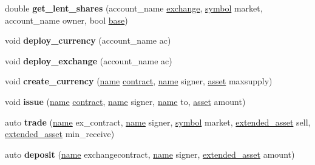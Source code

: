 \begin{DoxyCompactItemize}
\mbox{\label{classexchange__tester_aa583cf62252cc0e19d80e8287cd9a778}} 
double {\bfseries get\+\_\+lent\+\_\+shares} (account\+\_\+name \mbox{\hyperlink{classaacio_1_1exchange}{exchange}}, \mbox{\hyperlink{classaacio_1_1chain_1_1symbol}{symbol}} market, account\+\_\+name owner, bool \mbox{\hyperlink{structbase}{base}})
\item 
\mbox{\label{classexchange__tester_a01149395f13873c6f4264006b2756106}} 
void {\bfseries deploy\+\_\+currency} (account\+\_\+name ac)
\item 
\mbox{\label{classexchange__tester_ade5139d1cbaf91c2c8cbe19b256f460c}} 
void {\bfseries deploy\+\_\+exchange} (account\+\_\+name ac)
\item 
\mbox{\label{classexchange__tester_aa07ea33a6d74c6dbaf5fabd5353eaa78}} 
void {\bfseries create\+\_\+currency} (\mbox{\hyperlink{structaacio_1_1name}{name}} \mbox{\hyperlink{structaacio_1_1contract}{contract}}, \mbox{\hyperlink{structaacio_1_1name}{name}} signer, \mbox{\hyperlink{structaacio_1_1asset}{asset}} maxsupply)
\item 
\mbox{\label{classexchange__tester_a7f21ec8422d1bd3393534f856f1eddb8}} 
void {\bfseries issue} (\mbox{\hyperlink{structaacio_1_1name}{name}} \mbox{\hyperlink{structaacio_1_1contract}{contract}}, \mbox{\hyperlink{structaacio_1_1name}{name}} signer, \mbox{\hyperlink{structaacio_1_1name}{name}} to, \mbox{\hyperlink{structaacio_1_1asset}{asset}} amount)
\item 
\mbox{\label{classexchange__tester_ad0e2032e39b73cd0e6e00017b6245a45}} 
auto {\bfseries trade} (\mbox{\hyperlink{structaacio_1_1name}{name}} ex\+\_\+contract, \mbox{\hyperlink{structaacio_1_1name}{name}} signer, \mbox{\hyperlink{classaacio_1_1chain_1_1symbol}{symbol}} market, \mbox{\hyperlink{structaacio_1_1extended__asset}{extended\+\_\+asset}} sell, \mbox{\hyperlink{structaacio_1_1extended__asset}{extended\+\_\+asset}} min\+\_\+receive)
\item 
\mbox{\label{classexchange__tester_a5a4029d0bc8d2ee1ee3d340fbe74c987}} 
auto {\bfseries deposit} (\mbox{\hyperlink{structaacio_1_1name}{name}} exchangecontract, \mbox{\hyperlink{structaacio_1_1name}{name}} signer, \mbox{\hyperlink{structaacio_1_1extended__asset}{extended\+\_\+asset}} amount)

\end{DoxyCompactItemize}
